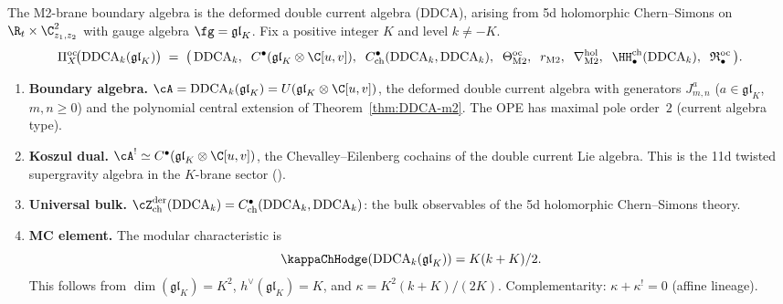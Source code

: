 \begin{computation}
\label{comp:platonic-M2}
The M2-brane boundary algebra is the deformed double current
algebra (DDCA), arising from 5d holomorphic Chern--Simons on
$\R_t \times \C^2_{z_1,z_2}$ with gauge algebra
$\fg = \mathfrak{gl}_K$. Fix a positive integer $K$ and level
$k \ne -K$.
\begin{equation}\label{eq:platonic-M2}
\Pi^{\mathrm{oc}}_X\!\bigl(\mathrm{DDCA}_k(\mathfrak{gl}_K)\bigr)
\;=\;
\bigl(\,
\mathrm{DDCA}_k,\;\;
C^\bullet(\mathfrak{gl}_K \otimes \C[u,v]),\;\;
C^\bullet_{\mathrm{ch}}(\mathrm{DDCA}_k, \mathrm{DDCA}_k),\;\;
\Theta^{\mathrm{oc}}_{\mathrm{M2}},\;\;
r_{\mathrm{M2}},\;\;
\nabla^{\mathrm{hol}}_{\mathrm{M2}},\;\;
\HH^{\mathrm{ch}}_\bullet(\mathrm{DDCA}_k),\;\;
\mathfrak{R}^{\mathrm{oc}}_\bullet
\,\bigr).
\end{equation}
\begin{enumerate}[label=\textup{(\roman*)},nosep]
\item \textbf{Boundary algebra.}
 $\cA = \mathrm{DDCA}_k(\mathfrak{gl}_K) = U(\mathfrak{gl}_K \otimes \C[u,v])$,
 the deformed double current algebra with generators
 $J^a_{m,n}$ ($a \in \mathfrak{gl}_K$, $m,n \ge 0$)
 and the polynomial central extension of
 Theorem~\textup{\ref{thm:DDCA-m2}}.
 The OPE has maximal pole order~$2$ (current algebra type).

\item \textbf{Koszul dual.}
 $\cA^! \simeq C^\bullet(\mathfrak{gl}_K \otimes \C[u,v])$,
 the Chevalley--Eilenberg cochains of the double current Lie
 algebra. This is the 11d twisted supergravity algebra in the
 $K$-brane sector \textup{(}\cite{Costello-1705.02500v1}\textup{)}.

\item \textbf{Universal bulk.}
 $\cZ^{\mathrm{der}}_{\mathrm{ch}}(\mathrm{DDCA}_k)
 = C^\bullet_{\mathrm{ch}}(\mathrm{DDCA}_k, \mathrm{DDCA}_k)$:
 the bulk observables of the 5d holomorphic Chern--Simons
 theory.

\item \textbf{MC element.}
 The modular characteristic is
 \begin{equation}\label{eq:platonic-kappa-M2}
 \kappaChHodge(\mathrm{DDCA}_k(\mathfrak{gl}_K)) = K(k + K)/2.
 \end{equation}
 This follows from $\dim(\mathfrak{gl}_K) = K^2$,
 $h^\vee(\mathfrak{gl}_K) = K$, and
 $\kappa = K^2(k + K)/(2K)$.
 Complementarity: $\kappa + \kappa^! = 0$ (affine lineage).


\end{enumerate}
\end{computation}
